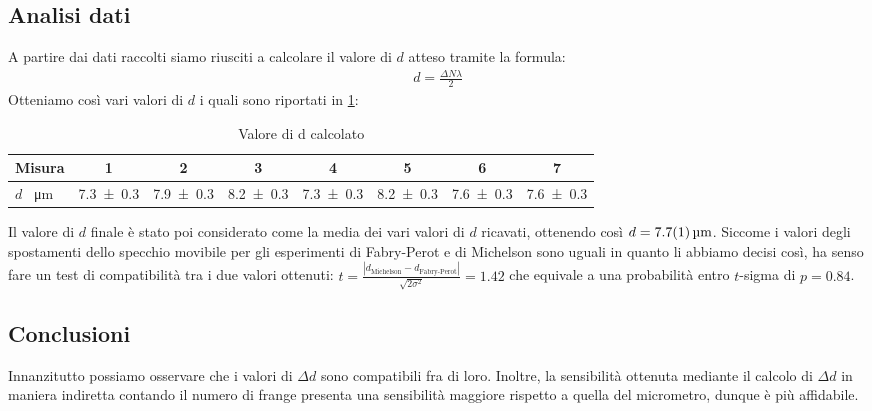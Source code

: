 \documentclass[a4paper]{article}
\begin{document}
\subsection{Analisi dati}
A partire dai dati raccolti siamo riusciti a calcolare il valore di $d$ atteso tramite la formula: 
\begin{align}
    d=\frac{\Delta N \lambda}{2}
\end{align}
Otteniamo così vari valori di $d$ i quali sono riportati in \cref{tab:valori-d-michelson}:

\begin{table}[htbp]
\centering
\begin{tabular}{|l|ccccccc|}
\hline
Misura & 1 & 2 & 3 & 4 & 5 & 6 & 7 \\\hline\hline
$d$ \SI{}{\micro\meter} & \SI{7.3 \pm 0.3}{} & \SI{7.9 \pm 0.3}{} & \SI{8.2 \pm 0.3}{} & \SI{7.3 \pm 0.3}{} & \SI{8.2 \pm 0.3}{} & \SI{7.6 \pm 0.3}{} & \SI{7.6 \pm 0.3}{} \\\hline
\end{tabular}
\caption{Valore di d calcolato}
\label{tab:valori-d-michelson}
\end{table}

Il valore di $d$ finale è stato poi considerato come la media dei vari valori di $d$ ricavati, ottenendo così $d=\SI{7.7\pm0.1}{\micro\meter}$.
Siccome i valori degli spostamenti dello specchio movibile per gli esperimenti di Fabry-Perot e di Michelson sono uguali in quanto li abbiamo decisi così, ha senso fare un test di compatibilità tra i due valori ottenuti:
$t=\frac{|d_{\text{Michelson}}-d_{\text{Fabry-Perot}}|}{\sqrt{2\sigma^2}}=\num{1.42}$ che equivale a una probabilità entro $t$-sigma di $p=\num{0.84}$.

\subsection{Conclusioni}
Innanzitutto possiamo osservare che i valori di $\Delta d$ sono compatibili fra di loro. Inoltre, la sensibilità ottenuta mediante il calcolo di $\Delta d$ in maniera indiretta contando il numero di frange presenta una sensibilità maggiore rispetto a quella del micrometro, dunque è più affidabile.
\end{document}
